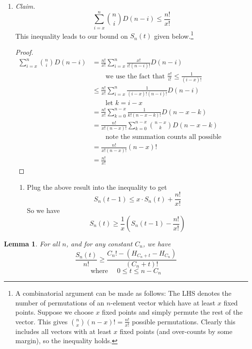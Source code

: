 \documentclass[12pt, a4paper]{article}
\newtheorem{lemma}{Lemma}
\begin{document}
\begin{enumerate}
		\item\textit{Claim.}
			\begin{equation*}
			\sum_{i=x}^n\binom{n}{i}D(n-i) \le \frac{n!}{x!}
			\end{equation*}
			This inequality leads to our bound on $S_{n}(t)$ given
			below.\footnote{A combinatorial argument can be made as follows: The LHS
			denotes the number of permutations of an $n$-element vector which have
			at least $x$ fixed points. Suppose we choose $x$ fixed points and
			simply permute the rest of the vector. This gives $\binom{n}{x}(n-x)!
			=\frac{n!}{x!}$ possible permutations. Clearly this includes all
			vectors with at least $x$ fixed points (and over-counts by some
			margin), so the inequality holds.}
			\begin{proof}
				\begin{align*}
				\sum_{i=x}^n\binom{n}{i}D(n-i) & =
				\frac{n!}{x!}\sum_{i=x}^{n}\frac{x!}{i!(n-i)!}D(n-i)\\
				& \qquad\text{we use the fact that }\frac{x!}{i!}\le\frac{1}{(i-x)!}\\
				& \le \frac{n!}{x!}\sum_{i=x}^{n}\frac{1}{(i-x)!(n-i)!}D(n-i)\\
				& \qquad\text{let $k=i-x$}\\
				& = \frac{n!}{x!}\sum_{k=0}^{n-x}\frac{1}{k!(n-x-k)!}D(n-x-k)\\
				& = \frac{n!}{x!(n-x)!}\sum_{k=0}^{n-x}\binom{n-x}{k}D(n-x-k)\\
				& \qquad\text{note the summation counts all possible permutations}\\
				& = \frac{n!}{x!(n-x)!}(n-x)!\\
				& = \frac{n!}{x!}				
				\end{align*}
			\end{proof}		
		\begin{enumerate}
		\item Plug the above result into the inequality to get
			\begin{equation*}
			S_{n}(t-1) \le x\cdot S_{n}(t) + \frac{n!}{x!}
			\end{equation*}
		So we have
			\begin{equation*}
			S_{n}(t)\ge \frac{1}{x}\left(S_{n}(t-1)-\frac{n!}{x!}\right)
			\end{equation*}
		\end{enumerate}
	\end{enumerate}
		\begin{lemma} For all $n$, and for any constant $C_n$, we have
			\begin{equation*}
			\frac{S_{n}(t)}{n!}\ge \frac{C_{n}! - (H_{C_{n}+t} - H_{C_{n}})}{(C_n+t)!}
			\end{equation*}
			\begin{equation*}
			\text{where }\quad0\le t\le n-C_{n}
			\end{equation*}
		\end{lemma}
\end{document}
